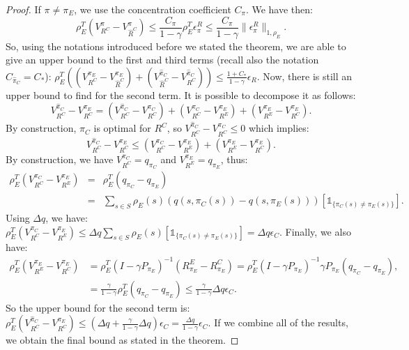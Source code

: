 \documentclass{llncs}
\begin{document}
\begin{proof}
If $\pi\neq\pi_E$, we use the concentration coefficient $C_\pi$. We have then:
\begin{equation}
  \rho_E^T(V^{\pi}_{R^C}-V^{\pi}_{\hat{R}^C})\leq\frac{C_\pi}{1-\gamma}\rho_E^T\epsilon^R_{\pi}\leq\frac{C_\pi}{1-\gamma}\|\epsilon^R_{\pi}\|_{1,\rho_E}.
  \end{equation}
So, using the notations introduced before we stated the theorem, we are able to give an upper bound to the first and third terms (recall also the notation $C_{\hat \pi_C} = C_*$):
$\rho_E^T((V^{\pi_E}_{R^C}-V^{\pi_E}_{\hat{R}^C})+(V^{\hat{\pi}_C}_{\hat{R}^C}-V^{\hat{\pi}_C}_{R^C}))\leq\frac{1+C_*}{1-\gamma}\epsilon_R$.
Now, there is still an upper bound to find for the second term. It is possible to decompose it as follows:
\begin{equation}
V^{\hat{\pi}_C}_{R^C}-V^{\pi_E}_{R^C}=(V^{\hat{\pi}_C}_{R^C}-V^{\pi_C}_{R^C})+(V^{\pi_C}_{R^C}-V^{\pi_E}_{R^E})+(V^{\pi_E}_{R^E}-V^{\pi_E}_{R^C}).
\end{equation}
By construction, $\pi_C$ is optimal for $R^C$, so $V^{\hat{\pi}_C}_{R^C}-V^{\pi_C}_{R^C}\leq0$ which implies:
\begin{equation}
V^{\hat{\pi}_C}_{R^C}-V^{\pi_E}_{R^C}\leq(V^{\pi_C}_{R^C}-V^{\pi_E}_{R^E})+(V^{\pi_E}_{R^E}-V^{\pi_E}_{R^C}).
\end{equation}
By construction, we have $V^{\pi_C}_{R^C}=q_{\pi_C}$ and $V^{\pi_E}_{R^E}=q_{\pi_E}$, thus:
\begin{eqnarray}
\rho_E^T(V^{\pi_C}_{R^C}-V^{\pi_E}_{R^E})&=&\rho_E^T(q_{\pi_C}-q_{\pi_E})\\
&=&\sum_{s\in S}\rho_E(s)(q(s,\pi_C(s))-q(s,\pi_E(s)))[\mathds{1}_{\{\pi_C(s)\neq\pi_E(s)\}}].
\end{eqnarray}
Using $\Delta q$, we have:
$\rho_E^T(V^{\pi_C}_{R^C}-V^{\pi_E}_{R^E})\leq\Delta q\sum_{s\in S}\rho_E(s)[\mathds{1}_{\{\pi_C(s)\neq\pi_E(s)\}}]= \Delta q \epsilon_C$.
Finally, we also have:
\begin{align}
\rho_E^T(V^{\pi_E}_{R^E}-V^{\pi_E}_{R^C})&=\rho_E^T(I-\gamma P_{\pi_E})^{-1}(R^E_{\pi_E}-R^C_{\pi_E})=\rho_E^T(I-\gamma P_{\pi_E})^{-1}\gamma P_{\pi_E}(q_{\pi_C}-q_{\pi_E}),
\\
&=\frac{\gamma}{1-\gamma}\rho_E^T(q_{\pi_C}-q_{\pi_E})\leq \frac{\gamma}{1-\gamma}\Delta q \epsilon_C.
\end{align}
So the upper bound for the second term is: $\rho_E^T(V^{\hat{\pi}_C}_{R^C}-V^{\pi_E}_{R^C})\leq (\Delta q +\frac{\gamma}{1-\gamma}\Delta q) \epsilon_C =   \frac{\Delta q}{1-\gamma}\epsilon_C$.
If we combine all of the results, we obtain the final bound as stated in the theorem.
\end{proof}
\end{document}
